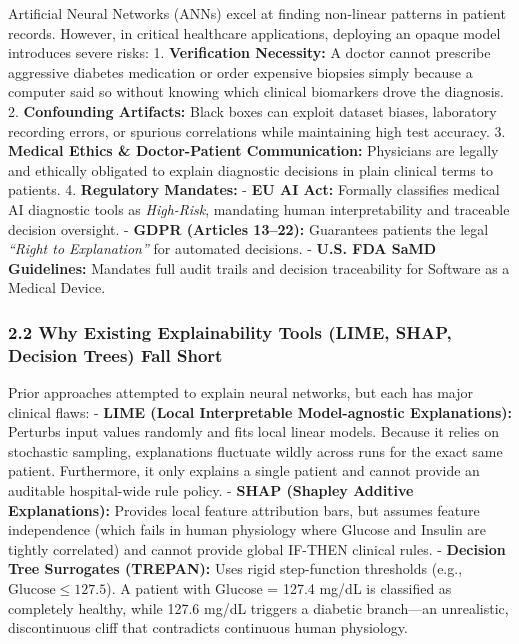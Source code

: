Artificial Neural Networks (ANNs) excel at finding non-linear patterns
in patient records. However, in critical healthcare applications,
deploying an opaque model introduces severe risks: 1.
\textbf{Verification Necessity:} A doctor cannot prescribe aggressive
diabetes medication or order expensive biopsies simply because a
computer said so without knowing which clinical biomarkers drove the
diagnosis. 2. \textbf{Confounding Artifacts:} Black boxes can exploit
dataset biases, laboratory recording errors, or spurious correlations
while maintaining high test accuracy. 3. \textbf{Medical Ethics \&
Doctor-Patient Communication:} Physicians are legally and ethically
obligated to explain diagnostic decisions in plain clinical terms to
patients. 4. \textbf{Regulatory Mandates:} - \textbf{EU AI Act:}
Formally classifies medical AI diagnostic tools as \emph{High-Risk},
mandating human interpretability and traceable decision oversight. -
\textbf{GDPR (Articles 13--22):} Guarantees patients the legal
\emph{``Right to Explanation''} for automated decisions. - \textbf{U.S.
FDA SaMD Guidelines:} Mandates full audit trails and decision
traceability for Software as a Medical Device.

\subsubsection{2.2 Why Existing Explainability Tools (LIME, SHAP,
Decision Trees) Fall
Short}\label{why-existing-explainability-tools-lime-shap-decision-trees-fall-short}

Prior approaches attempted to explain neural networks, but each has
major clinical flaws: - \textbf{LIME (Local Interpretable Model-agnostic
Explanations):} Perturbs input values randomly and fits local linear
models. Because it relies on stochastic sampling, explanations fluctuate
wildly across runs for the exact same patient. Furthermore, it only
explains a single patient and cannot provide an auditable hospital-wide
rule policy. - \textbf{SHAP (Shapley Additive Explanations):} Provides
local feature attribution bars, but assumes feature independence (which
fails in human physiology where Glucose and Insulin are tightly
correlated) and cannot provide global IF-THEN clinical rules. -
\textbf{Decision Tree Surrogates (TREPAN):} Uses rigid step-function
thresholds (e.g., \(\text{Glucose} \le 127.5\)). A patient with Glucose
= 127.4 mg/dL is classified as completely healthy, while 127.6 mg/dL
triggers a diabetic branch---an unrealistic, discontinuous cliff that
contradicts continuous human physiology.


